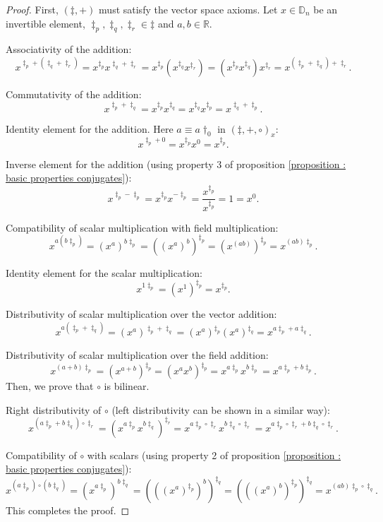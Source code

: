 \documentclass{article}
\begin{document}
\begin{proof}
    First, $(\ddagger,+)$ must satisfy the vector space axioms. Let $x \in \mathbb{D}_n$ be an invertible element, $\ddagger_p, \ddagger_q, \ddagger_r \in \ddagger$ and $a,b \in \mathbb{R}$. 

    Associativity of the addition:
    $$ x^{\ddagger_p + (\ddagger_q + \ddagger_r)} = x^{\ddagger_p} x^{\ddagger_q + \ddagger_r} = x^{\ddagger_p} (x^{\ddagger_q} x^{\ddagger_r}) = (x^{\ddagger_p} x^{\ddagger_q}) x^{\ddagger_r} = x^{(\ddagger_p + \ddagger_q) + \ddagger_r}. $$

    Commutativity of the addition:
    $$ x^{\ddagger_p + \ddagger_q} = x^{\ddagger_p} x^{\ddagger_q} = x^{\ddagger_q} x^{\ddagger_p} = x^{\ddagger_q + \ddagger_p}. $$

    Identity element for the addition. Here $a \equiv a\dagger_0$ in $(\ddagger, +, \circ)_x$:
    $$ x^{\ddagger_p + 0} = x^{\ddagger_p} x^0 = x^{\ddagger_p}. $$

    Inverse element for the addition (using property 3 of proposition \ref{proposition : basic properties conjugates}):
    $$ x^{\ddagger_p - \ddagger_p} = x^{\ddagger_p} x^{-\ddagger_p} = \frac{x^{\ddagger_p}}{x^{\ddagger_p}} = 1 = x^0. $$

    Compatibility of scalar multiplication with field multiplication:
    $$ x^{a(b\ddagger_p)} = (x^a)^{b\ddagger_p} = ((x^{a})^b)^{\ddagger_p} = (x^{(ab)})^{\ddagger_p} = x^{(ab)\ddagger_p}. $$

    Identity element for the scalar multiplication:
    $$ x^{1\ddagger_p} = (x^1)^{\ddagger_p} = x^{\ddagger_p}. $$

    Distributivity of scalar multiplication over the vector addition:
    $$ x^{a(\ddagger_p + \ddagger_q)} = (x^a)^{\ddagger_p + \ddagger_q} = (x^{a})^{\ddagger_p}(x^a)^{\ddagger_q} = x^{a\ddagger_p + a\ddagger_q}. $$

    Distributivity of scalar multiplication over the field addition:
    $$ x^{(a+b)\ddagger_p} = (x^{a+b})^{\ddagger_p} = (x^ax^b)^{\ddagger_p} = x^{a\ddagger_p} x^{b\ddagger_p} = x^{a\ddagger_p + b\ddagger_p}. $$
    Then, we prove that $\circ$ is bilinear.

    Right distributivity of $\circ$ (left distributivity can be shown in a similar way):
    $$ x^{(a \ddagger_p + b\ddagger_q)\circ\ddagger_r} = (x^{a\ddagger_p} x^{b\ddagger_q})^{\ddagger_r} = x^{a\ddagger_p\circ\ddagger_r}x^{b\ddagger_q\circ\ddagger_r} = x^{a\ddagger_p\circ\ddagger_r + b\ddagger_q\circ\ddagger_r}. $$

    Compatibility of $\circ$ with scalars (using property 2 of proposition \ref{proposition : basic properties conjugates}):
    $$ x^{(a\ddagger_p)\circ(b\ddagger_q)} = (x^{a\ddagger_p})^{b\ddagger_q} = (((x^a)^{\ddagger_p})^{b})^{\ddagger_q} = (((x^a)^{b})^{\ddagger_p})^{\ddagger_q} = x^{(ab)\ddagger_p \circ \ddagger_q}. $$
    This completes the proof.
\end{proof}
\end{document}
